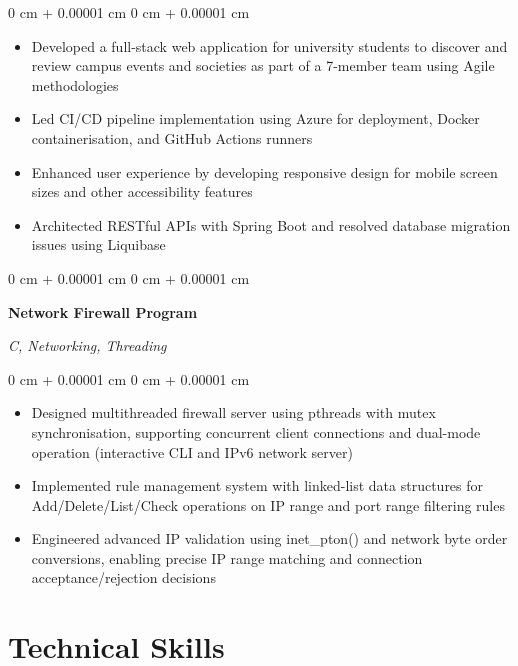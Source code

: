 \documentclass[10pt, a4paper]{article}
\newenvironment{highlights}{
    \begin{itemize}[
        topsep=0.10 cm,
        parsep=0.10 cm,
        partopsep=0pt,
        itemsep=0pt,
        leftmargin=20pt
    ]
}{
    \end{itemize}
} %
\newenvironment{onecolentry}{
    \begin{adjustwidth}{
        0 cm + 0.00001 cm
    }{
        0 cm + 0.00001 cm
    }
}{
    \end{adjustwidth}
} %
\newenvironment{twocolentry}[2][]{
    \onecolentry
    \def\secondColumn{#2}
    \setcolumnwidth{\fill, 4.5 cm}
    \begin{paracol}{2}
}{
    \switchcolumn \raggedleft \secondColumn
    \end{paracol}
    \endonecolentry
} %
\begin{document}
    \vspace{0.10 cm}
    \begin{onecolentry}
        \begin{highlights}
            \item Developed a full-stack web application for university students to discover and review campus events and societies as part of a 7-member team using Agile methodologies
            \item Led CI/CD pipeline implementation using Azure for deployment, Docker containerisation, and GitHub Actions runners
            \item Enhanced user experience by developing responsive design for mobile screen sizes and other accessibility features
            \item Architected RESTful APIs with Spring Boot and resolved database migration issues using Liquibase
        \end{highlights}
    \end{onecolentry}

    \vspace{0.2 cm}

    \begin{twocolentry}{
        \textit{C, Networking, Threading}
    }
        \textbf{Network Firewall Program}
    \end{twocolentry}

    \vspace{0.10 cm}
    \begin{onecolentry}
        \begin{highlights}
            \item Designed multithreaded firewall server using pthreads with mutex synchronisation, supporting concurrent client connections and dual-mode operation (interactive CLI and IPv6 network server)
            \item Implemented rule management system with linked-list data structures for Add/Delete/List/Check operations on IP range and port range filtering rules
            \item Engineered advanced IP validation using inet\_pton() and network byte order conversions, enabling precise IP range matching and connection acceptance/rejection decisions
        \end{highlights}
    \end{onecolentry}

    \section{Technical Skills}
\end{document}
